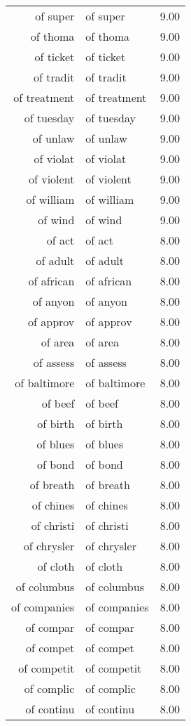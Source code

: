 \begin{table}[ht]
\begin{tabular}{rlr}
  of super & of super & 9.00 \\ 
  of thoma & of thoma & 9.00 \\ 
  of ticket & of ticket & 9.00 \\ 
  of tradit & of tradit & 9.00 \\ 
  of treatment & of treatment & 9.00 \\ 
  of tuesday & of tuesday & 9.00 \\ 
  of unlaw & of unlaw & 9.00 \\ 
  of violat & of violat & 9.00 \\ 
  of violent & of violent & 9.00 \\ 
  of william & of william & 9.00 \\ 
  of wind & of wind & 9.00 \\ 
  of act & of act & 8.00 \\ 
  of adult & of adult & 8.00 \\ 
  of african & of african & 8.00 \\ 
  of anyon & of anyon & 8.00 \\ 
  of approv & of approv & 8.00 \\ 
  of area & of area & 8.00 \\ 
  of assess & of assess & 8.00 \\ 
  of baltimore & of baltimore & 8.00 \\ 
  of beef & of beef & 8.00 \\ 
  of birth & of birth & 8.00 \\ 
  of blues & of blues & 8.00 \\ 
  of bond & of bond & 8.00 \\ 
  of breath & of breath & 8.00 \\ 
  of chines & of chines & 8.00 \\ 
  of christi & of christi & 8.00 \\ 
  of chrysler & of chrysler & 8.00 \\ 
  of cloth & of cloth & 8.00 \\ 
  of columbus & of columbus & 8.00 \\ 
  of companies & of companies & 8.00 \\ 
  of compar & of compar & 8.00 \\ 
  of compet & of compet & 8.00 \\ 
  of competit & of competit & 8.00 \\ 
  of complic & of complic & 8.00 \\ 
  of continu & of continu & 8.00 \\ 

\end{tabular}
\end{table}
